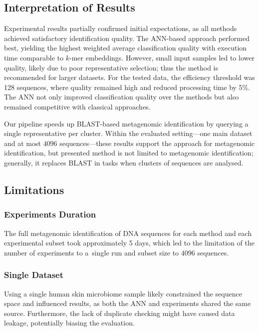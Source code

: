 \documentclass[biomedinformatics,article,submit,moreauthors]{Definitions/mdpi}
\begin{document}
        \subsection{Interpretation of Results}
            Experimental results partially confirmed initial expectations, as all methods achieved satisfactory identification quality. The ANN-based approach performed best, yielding the highest weighted average classification quality with execution time comparable to $k$-mer embeddings. However, small input samples led to lower quality, likely due to poor representative selection; thus the method is recommended for larger datasets. For the tested data, the efficiency threshold was 128 sequences, where quality remained high and reduced processing time by 5\%. The ANN not only improved classification quality over the methods but also remained competitive with classical approaches.

            Our pipeline speeds up BLAST-based metagenomic identification by querying a single representative per cluster.
            Within the evaluated setting---one main dataset and at most $4096$ sequences---these results support the approach for metagenomic identification, but presented method is not limited to metagenomic identification; generally, it replaces BLAST in tasks when clusters of sequences are analysed.

        \subsection{Limitations}
            \subsubsection{Experiments Duration}
                The full metagenomic identification of DNA sequences for each method and each experimental subset took approximately 5 days, which led to the limitation of the number of experiments to a~single run and subset size to $4096$ sequences.

            \subsubsection{Single Dataset}
                Using a single human skin microbiome sample likely constrained the sequence space and influenced results, as both the ANN and experiments shared the same source. Furthermore, the lack of duplicate checking might have caused data leakage, potentially biasing the evaluation.
\end{document}
